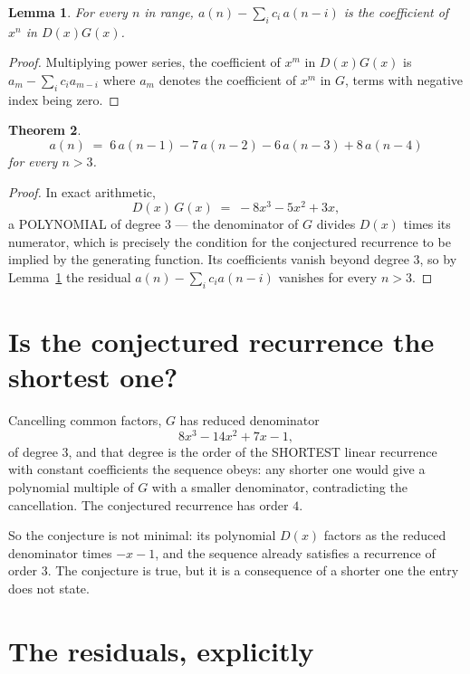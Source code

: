 \documentclass[11pt,a4paper]{article}
\theoremstyle{plain}
\newtheorem{theorem}{Theorem}
\newtheorem{lemma}[theorem]{Lemma}
\theoremstyle{definition}
\begin{document}
\begin{lemma}\label{lem:key}
For every $n$ in range, $a(n)-\sum_i c_i\,a(n-i)$ is the coefficient of $x^{n}$ in
$D(x)G(x)$.
\end{lemma}

\begin{proof}
Multiplying power series, the coefficient of $x^{m}$ in $D(x)G(x)$ is
$a_m-\sum_i c_i a_{m-i}$ where $a_m$ denotes the coefficient of $x^{m}$ in $G$, terms with
negative index being zero.
\end{proof}

\begin{theorem}
\[
a(n)\;=\;6\,a(n-1) - 7\,a(n-2) - 6\,a(n-3) + 8\,a(n-4)
\]
for every $n>3$.
\end{theorem}

\begin{proof}
In exact arithmetic,
\[
D(x)\,G(x)\;=\;- 8 x^{3} - 5 x^{2} + 3 x,
\]
a POLYNOMIAL of degree $3$ --- the denominator of $G$ divides $D(x)$ times its numerator,
which is precisely the condition for the conjectured recurrence to be implied by the
generating function. Its coefficients vanish beyond degree $3$, so by
Lemma~\ref{lem:key} the residual $a(n)-\sum_ic_ia(n-i)$ vanishes for every
$n>3$.
\end{proof}

\section{Is the conjectured recurrence the shortest one?}

Cancelling common factors, $G$ has reduced denominator
\[
8 x^{3} - 14 x^{2} + 7 x - 1,
\]
of degree $3$, and that degree is the order of the SHORTEST linear recurrence with
constant coefficients the sequence obeys: any shorter one would give a polynomial multiple of
$G$ with a smaller denominator, contradicting the cancellation. The conjectured recurrence has
order $4$.

So the conjecture is not minimal: its polynomial $D(x)$ factors as the reduced denominator times $- x - 1$, and the sequence already satisfies a recurrence of order 3. The conjecture is true, but it is a consequence of a shorter one the entry does not state.

\section{The residuals, explicitly}
\end{document}
